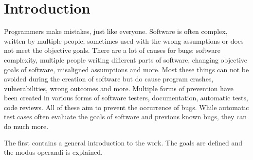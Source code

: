 \chapter{Introduction}
\label{cha:intro}
Programmers make mistakes, just like everyone.
Software is often complex, written by multiple people, sometimes used with the wrong assumptions or does not meet the objective goals. 
There are a lot of causes for bugs: software complexity, multiple people writing different parts of software, changing objective goals of software, misaligned assumptions and more. Most these things can not be avoided during the creation of software but do cause program crashes, vulnerabilities, wrong outcomes and more.
Multiple forms of prevention have been created in various forms of software testers, documentation, automatic tests, code reviews. All of these aim to prevent the occurrence of bugs. While automatic test cases often evaluate the goals of software and previous known bugs, they can do much more.



The first contains a general introduction to the work. The goals are defined and the modus operandi is explained.

